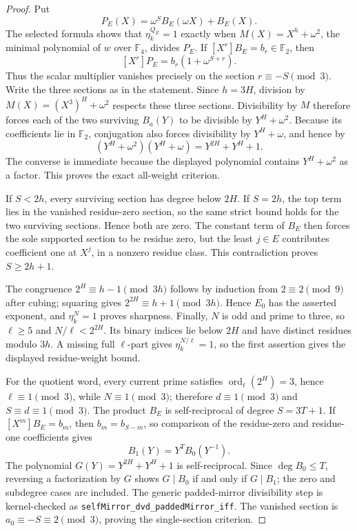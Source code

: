 \documentclass[11pt]{article}
\theoremstyle{definition}
\theoremstyle{remark}
\begin{document}
\begin{proof}
Put
\[
 P_E(X)=\omega^S B_E(\omega X)+B_E(X).
\]
The selected formula shows that $\eta_k^{Q_E}=1$ exactly when
$M(X)=X^h+\omega^2$, the minimal polynomial of $w$ over $\mathbb F_4$,
divides $P_E$.  If $[X^r]B_E=b_r\in\mathbb F_2$, then
\[
 [X^r]P_E=b_r(1+\omega^{S+r}).
\]
Thus the scalar multiplier vanishes precisely on the section
$r\equiv-S\pmod3$.  Write
the three sections as in the statement.
Since $h=3H$, division by
$M(X)=(X^3)^H+\omega^2$ respects these three sections.  Divisibility by $M$
therefore forces each of the two surviving $B_a(Y)$ to be divisible by
$Y^H+\omega^2$.  Because its coefficients lie in $\mathbb F_2$, conjugation
also forces divisibility by $Y^H+\omega$, and hence by
\[
 (Y^H+\omega^2)(Y^H+\omega)=Y^{2H}+Y^H+1.
\]
The converse is immediate because the displayed polynomial contains
$Y^H+\omega^2$ as a factor.  This proves the exact all-weight criterion.

If $S<2h$, every surviving section has degree below $2H$.  If $S=2h$, the
top term lies in the vanished residue-zero section, so the same strict bound
holds for the two surviving sections.  Hence both are zero.  The constant
term of $B_E$ then forces the sole supported section to be residue zero, but
the least $j\in E$ contributes coefficient one at $X^j$, in a nonzero residue
class.  This contradiction proves $S\geq2h+1$.

The congruence $2^H\equiv h-1\pmod{3h}$ follows by induction from
$2\equiv2\pmod9$ after cubing; squaring gives
$2^{2H}\equiv h+1\pmod{3h}$.  Hence $E_0$ has the asserted exponent, and
$\eta_k^N=1$ proves sharpness.  Finally, $N$ is odd and prime to three, so
$\ell\geq5$ and $N/\ell<2^{2H}$.  Its binary indices lie below $2H$ and
have distinct residues modulo $3h$.  A missing full $\ell$-part gives
$\eta_k^{N/\ell}=1$, so the first assertion gives the displayed residue-weight
bound.

For the quotient word, every current prime satisfies
$\operatorname{ord}_{\ell}(2^H)=3$, hence $\ell\equiv1\pmod3$, while
$N\equiv1\pmod3$; therefore $d\equiv1\pmod3$ and
$S\equiv d\equiv1\pmod3$.  The product $B_E$ is self-reciprocal of degree
$S=3T+1$.  If $[X^m]B_E=b_m$, then $b_m=b_{S-m}$, so comparison of the
residue-zero and residue-one coefficients gives
\[
 B_1(Y)=Y^TB_0(Y^{-1}).
\]
The polynomial $G(Y)=Y^{2H}+Y^H+1$ is self-reciprocal.  Since
$\deg B_0\leq T$, reversing a factorization by $G$ shows
$G\mid B_0$ if and only if $G\mid B_1$; the zero and subdegree cases are
included.  The generic padded-mirror divisibility step is kernel-checked as
\texttt{selfMirror\_dvd\_paddedMirror\_iff}.  The vanished section is
$a_0\equiv-S\equiv2\pmod3$, proving the single-section criterion.


\end{proof}
\end{document}

